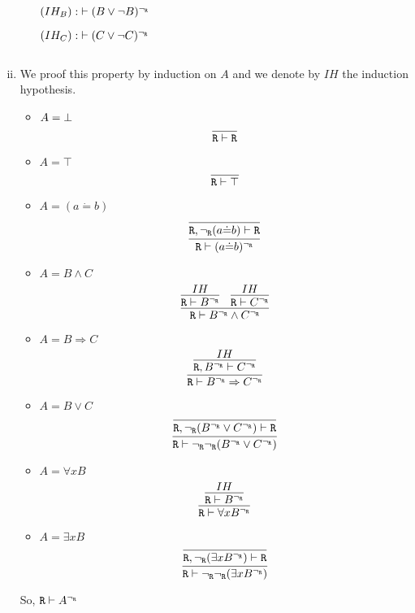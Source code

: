 \begin{enumerate}[(i)]
\begin{itemize}
            $(IH_B) : \; \vdash (B \vee \neg B)^{\neg_{\texttt{R}}}$
            
            $(IH_C) : \; \vdash (C \vee \neg C)^{\neg_{\texttt{R}}}$
            
            $$
            $$
    \end{itemize}

    \item We proof this property by induction on $A$ and we denote by $IH$ the induction hypothesis.
    \begin{itemize}
        \item $A=\bot$
            $$
                \infer{
                    \R \vdash \R
                }{
                }
            $$
        \item $A=\top$
            $$
                \infer{
                    \R \vdash \top
                }{
                }
            $$
        \item $A=(a \dot{=} b)$
            $$
                \infer{
                    \R \vdash (a \dot{=} b)^\ngr
                }{
                    \infer{
                        \R, \ngr(a \dot{=} b) \vdash \R
                    }{
                    }
                }
            $$
        \item $A=B\wedge C$
            $$
                \infer{
                    \R \vdash B^\ngr \wedge C^\ngr
                }{
                    \infer{
                        \R \vdash B^\ngr
                    }{
                        IH
                    }&
                    \infer{
                        \R \vdash C^\ngr
                    }{
                        IH
                    }
                }
            $$
        \item $A=B \Rightarrow C$
            $$
                \infer{
                    \R \vdash B^\ngr \Rightarrow C^\ngr
                }{
                    \infer{
                        \R, B^\ngr \vdash C^\ngr
                    }{
                        IH
                    }
                }
            $$
        \item $A=B \vee C$
            $$
                \infer{
                    \R \vdash \ngr\ngr(B^\ngr \vee C^\ngr)
                }{
                    \infer{
                        \R, \ngr(B^\ngr \vee C^\ngr) \vdash \R
                    }{
                    }
                }
            $$
        \item $A=\forall x B$
            $$
                \infer{
                    \R \vdash \forall x B^\ngr
                }{
                    \infer{
                        \R \vdash B^\ngr
                    }{
                        IH
                    }
                }
            $$
        \item $A=\exists x B$
            $$
                \infer{
                    \R \vdash \ngr\ngr(\exists x B^\ngr)
                }{
                    \infer{
                        \R, \ngr(\exists x B^\ngr) \vdash \R
                    }{
                    }
                }
            $$
    \end{itemize}
    So, $\texttt{R}\vdash A^{\neg_{\texttt{R}}}$
    

\end{enumerate}
